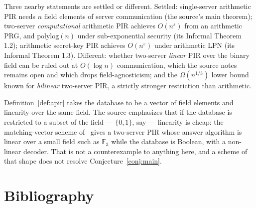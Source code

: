 \documentclass{aicr-conjecture}
\newcommand{\F}{\mathbb{F}}
\newcommand{\eps}{\varepsilon}
\begin{document}
\begin{remark}
Three nearby statements are settled or different. Settled: single-server
arithmetic PIR needs $n$ field elements of server communication (the
source's main theorem); two-server \emph{computational} arithmetic PIR
achieves $O(n^{\eps})$ from an arithmetic PRG, and $\mathrm{polylog}(n)$
under sub-exponential security (its Informal Theorem 1.2); arithmetic
secret-key PIR achieves $O(n^{\eps})$ under arithmetic LPN (its Informal
Theorem 1.3). Different: whether two-server \emph{linear} PIR over the
binary field can be ruled out at $O(\log n)$ communication, which the
source notes remains open and which drops field-agnosticism; and the
$\Omega(n^{1/3})$ lower bound known for \emph{bilinear} two-server PIR,
a strictly stronger restriction than arithmetic.
\end{remark}

\begin{remark}\label{rem:alphabet}
Definition~\ref{def:apir} takes the database to be a vector of field
elements and linearity over the same field. The source emphasizes that
if the database is restricted to a subset of the field --- $\{0,1\}$, say
--- linearity is cheap: the matching-vector scheme of~\cite{DG15} gives a
two-server PIR whose answer algorithm is linear over a small field such
as $\F_{3}$ while the database is Boolean, with a non-linear decoder.
That is not a counterexample to anything here, and a scheme of that shape
does not resolve Conjecture~\ref{conj:main}.
\end{remark}

\section{Bibliography}
\end{document}
